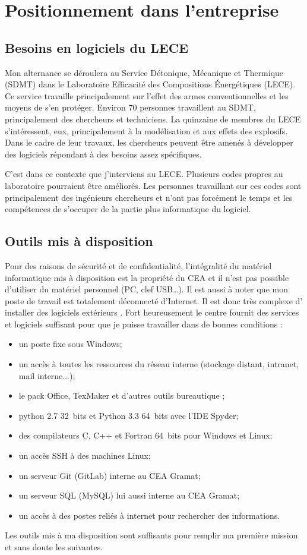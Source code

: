 \section{Positionnement dans l'entreprise}
\subsection{Besoins en logiciels du LECE}
Mon alternance se déroulera au Service Détonique, Mécanique et Thermique (SDMT) dans le Laboratoire  Efficacité des Compositions Énergétiques (LECE). Ce service travaille principalement sur l'effet des armes conventionnelles et les moyens de s'en protéger. Environ 70 personnes travaillent au SDMT, principalement des chercheurs et techniciens. La quinzaine de membres du LECE s'intéressent, eux, principalement à la modélisation et aux effets des explosifs. Dans le cadre de leur travaux, les chercheurs peuvent être amenés à développer des logiciels répondant à des besoins assez spécifiques.

C'est dans ce contexte que j'interviens au LECE. Plusieurs codes propres au laboratoire pourraient être améliorés. Les personnes travaillant sur ces codes sont principalement des ingénieurs chercheurs et n'ont pas forcément le temps et les compétences de s'occuper de la partie plus \og informatique \fg{} du logiciel.  

\subsection{Outils mis à disposition}
Pour des raisons de sécurité et de confidentialité, l'intégralité du matériel informatique mis à disposition est la propriété du CEA et il n'est pas possible d'utiliser du matériel personnel (PC, clef USB\dots{}). Il est aussi à noter que mon poste de travail est totalement déconnecté d'Internet. Il est donc très complexe d' installer des logiciels \og extérieurs \fg. Fort heureusement le centre fournit des services et logiciels suffisant pour que je puisse travailler dans de bonnes conditions : 
\begin{itemize}
\item un poste fixe sous Windows;
\item un accès à toutes les ressources du réseau interne (stockage distant, intranet, mail interne...);
\item le pack Office, TexMaker et d'autres outils \og bureautique \fg;
\item python 2.7 32~bits et Python 3.3 64~bits avec l'IDE Spyder;
\item des compilateurs C, C++ et Fortran 64~bits pour Windows et Linux;
\item un accès SSH à des machines Linux;
\item un serveur Git (GitLab) interne au CEA Gramat;
\item un serveur SQL (MySQL) lui aussi interne au CEA Gramat;
\item un accès à des postes reliés à internet pour rechercher des informations.
\end{itemize}
Les outils mis à ma disposition sont suffisants pour remplir ma première mission et sans doute les suivantes. 
 	